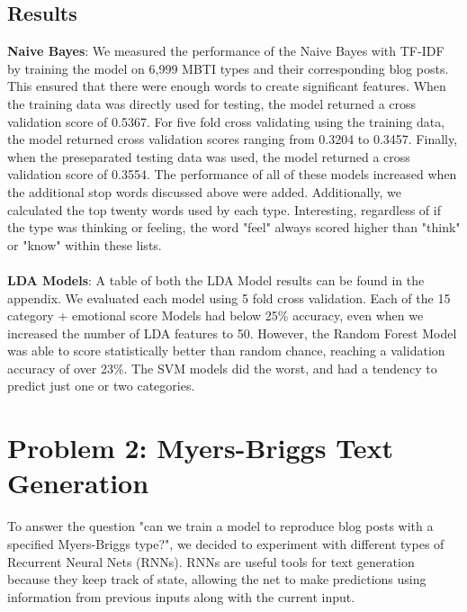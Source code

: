 \documentclass{article}
\begin{document}
\subsection{Results}
\textbf{Naive Bayes}: We measured the performance of the Naive Bayes with TF-IDF by training the model on 6,999 MBTI types and their corresponding blog posts. This ensured that there were enough words to create significant features. When the training data was directly used for testing, the model returned a cross validation score of 0.5367. For five fold cross validating using the training data, the model returned cross validation scores ranging from 0.3204 to 0.3457. Finally, when the preseparated testing data was used, the model returned a cross validation score of 0.3554. The performance of all of these models increased when the additional stop words discussed above were added. Additionally, we calculated the top twenty words used by each type. Interesting, regardless of if the type was thinking or feeling, the word "feel" always scored higher than "think" or "know" within these lists. \\ \\
\textbf{LDA Models}: A table of both the LDA Model results can be found in the appendix. We evaluated each model using 5 fold cross validation. Each of the 15 category + emotional score Models had below 25\% accuracy, even when we increased the number of LDA features to 50. However, the Random Forest Model was able to score statistically better than random chance, reaching a validation accuracy of over 23\%. The SVM models did the worst, and had a tendency to predict just one or two categories. 

\section{Problem 2: Myers-Briggs Text Generation}
To answer the question "can we train a model to reproduce blog posts with a specified Myers-Briggs type?", we decided to experiment with different types of Recurrent Neural Nets (RNNs). RNNs are useful tools for text generation because they keep track of state, allowing the net to make predictions using information from previous inputs along with the current input.
\end{document}
